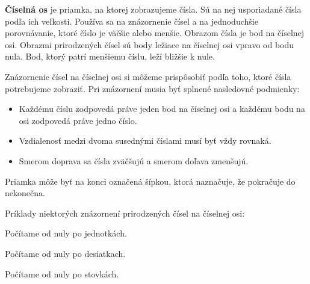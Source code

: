 \documentclass{article}
\begin{document}
\textbf{Číselná os} je priamka, na ktorej zobrazujeme čísla. Sú na nej usporiadané čísla podľa ich veľkosti. Používa sa na znázornenie čísel a na jednoduchšie porovnávanie, ktoré číslo je väčšie alebo menšie. Obrazom čísla je bod na číselnej osi. Obrazmi prirodzených čísel sú body ležiace na číselnej osi vpravo od bodu nula. Bod, ktorý patrí menšiemu číslu, leží bližšie k nule.

Znázornenie čísel na číselnej osi si môžeme prispôsobiť podľa toho, ktoré čísla potrebujeme zobraziť. Pri znázornení musia byť splnené nasledovné podmienky:
\begin{itemize}
  \item Každému číslu zodpovedá práve jeden bod na číselnej osi a každému bodu na osi zodpovedá práve jedno číslo.
  \item Vzdialenosť medzi dvoma susednými číslami musí byť vždy rovnaká.
  \item Smerom doprava sa čísla zväčšujú a smerom doľava zmenšujú.
\end{itemize}
Priamka môže byť na konci označená šípkou, ktorá naznačuje, že pokračuje do nekonečna.

Príklady niektorých znázornení prirodzených čísel na číselnej osi:

\begin{center}
  Počítame od nuly po jednotkách. \vspace{5mm}

\end{center}

\begin{center}
  Počítame od nuly po desiatkach. \vspace{5mm}

\end{center}

\begin{center}
  Počítame od nuly po stovkách. \vspace{5mm}

\end{center}
\end{document}
